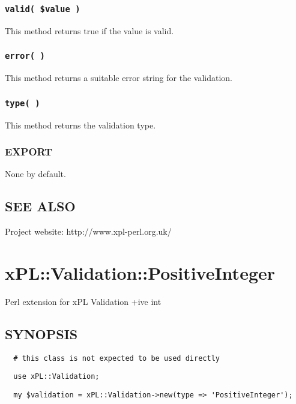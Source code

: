 \documentclass[12pt,a4paper]{article}
\begin{document}
\subsubsection*{\texttt{valid( \$value )}\label{xPL::Validation_valid_value_}}


This method returns true if the value is valid.

\subsubsection*{\texttt{error( )}\label{xPL::Validation_error_}}


This method returns a suitable error string for the validation.

\subsubsection*{\texttt{type( )}\label{xPL::Validation_type_}}


This method returns the validation type.

\subsubsection*{EXPORT\label{xPL::Validation_EXPORT}}


None by default.

\subsection*{SEE ALSO\label{xPL::Validation_SEE_ALSO}}


Project website: http://www.xpl-perl.org.uk/

\newpage
\section{xPL::Validation::PositiveInteger\label{xPL::Validation::PositiveInteger}}


Perl extension for xPL Validation +ive int

\subsection*{SYNOPSIS\label{xPL::Validation::PositiveInteger_SYNOPSIS}}
\begin{verbatim}
  # this class is not expected to be used directly
\end{verbatim}
\begin{verbatim}
  use xPL::Validation;
\end{verbatim}
\begin{verbatim}
  my $validation = xPL::Validation->new(type => 'PositiveInteger');
\end{verbatim}
\end{document}

